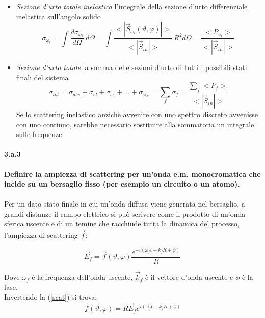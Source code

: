\documentclass[twoside]{article}
\begin{document}
\begin{itemize}
    \item \textit{Sezione d'urto totale inelastica} l'integrale della sezione d'urto differenziale inelastica sull'angolo solido
    \begin{equation}
        \sigma_{\omega_i}=\int \frac{d\sigma_{\omega_i}}{d\Omega} \ d\Omega=\int \frac{<|\vec{S}_{\omega_i}(\vartheta, \varphi)|>}{<|\vec{S}_{in}|>} \ R^2 d\Omega=\frac{<P_{\omega_i}>}{<|\vec{S}_{in}|>}
    \end{equation}
    
    \item \textit{Sezione d'urto totale} la somma delle sezioni d'urto di tutti i
possibili stati finali del sistema
\begin{equation}
    \sigma_{tot}=\sigma_{abs}+\sigma_{el}+\sigma_{\omega_i}+...+\sigma_{\omega_N}=\sum_{f}\sigma_f=\frac{\sum_f <P_f>}{<|\vec{S}_{in}|>}
\end{equation}
  Se lo scattering inelastico anzichè avvenire con uno spettro discreto avvenisse con uno continuo, sarebbe necessario sostituire alla sommatoria un integrale sulle frequenze.  
  
\end{itemize}

\paragraph{3.a.3}\textbf{Definire la ampiezza di scattering per un’onda e.m. monocromatica che incide su
un bersaglio fisso (per esempio un circuito o un atomo). }\\ \\
Per un dato stato finale in cui un'onda diffusa viene generata nel bersaglio, a
grandi distanze il campo elettrico si può scrivere come il prodotto di un'onda sferica uscente e di un temine che racchiude tutta la dinamica del
processo, l'ampiezza di scattering $\vec{f}$: 

\begin{equation}\label{scat}
    \vec{E}_f=\vec{f}(\vartheta, \varphi)\frac{e^{-i(\omega_f t -k_f R +\phi)}}{R}
\end{equation}

Dove $\omega_f$ è la frequenza dell'onda uscente, $\vec{k}_f$ è il vettore d'onda uscente e $\phi$ è la fase.
\\
Invertendo la (\ref{scat}) si trova:
\begin{equation}
    \vec{f}(\vartheta, \varphi)=R\vec{E}_f e^{i(\omega_f t -k_f R +\phi)}
\end{equation}
\end{document}
